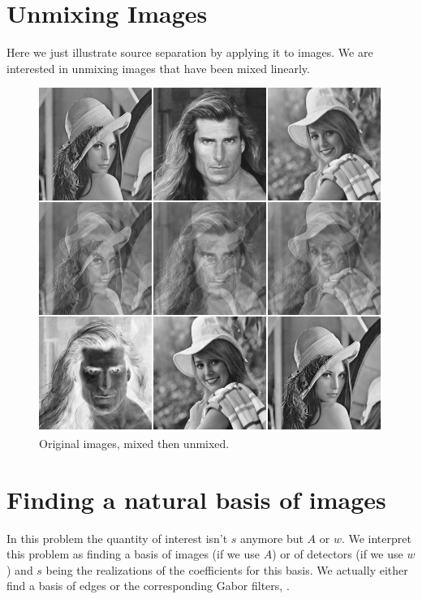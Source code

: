 \documentclass[a4paper,BCOR=5mm,oneside,openany]{scrreprt}
\begin{document}
\section{Unmixing Images}

Here we just illustrate source separation by applying it to images. We are interested in unmixing images that have been mixed linearly.

\begin{figure}[H]
	\centering
	\includegraphics[width=\textwidth]{images/imagemixing}
	\caption{Original images, mixed then unmixed.}
\end{figure}

\section{Finding a natural basis of images}

In this problem the quantity of interest isn't $s$ anymore but $A$ or $w$. We interpret this problem as finding a basis of images (if we use $A$) or of detectors (if we use $w$) and $s$ being the realizations of the coefficients for this basis. We actually either find a basis of edges or the corresponding Gabor filters, \cite{Bell}.
\end{document}
